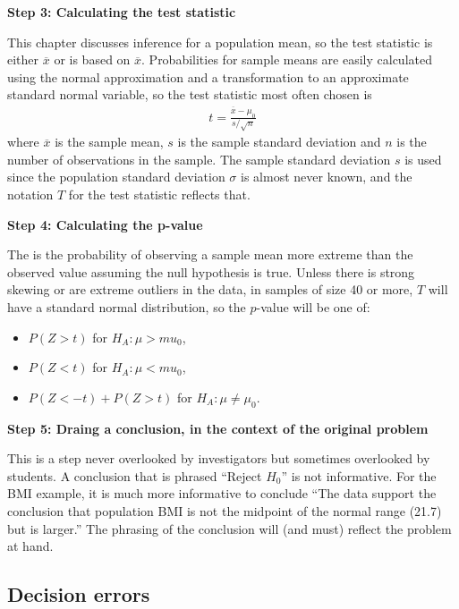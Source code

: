 \begin{spacing}{1.5}
\textbf{Step 3: Calculating the test statistic}

This chapter discusses inference for a population mean, so the test statistic is either $\overline{x}$ or is based on $\overline{x}$.  Probabilities for sample means are easily calculated using the normal approximation and a transformation to an approximate standard normal variable, so the test statistic most often chosen is 
\begin{eqnarray}
	t=\frac{\overline{x}-\mu_0}{s/\sqrt{n}}
	\end{eqnarray} 
where $\overline{x}$ is the sample mean, $s$ is the sample standard deviation and $n$ is the number of observations in the sample. The sample standard deviation $s$ is used since the population standard deviation $\sigma$ is almost never known, and the notation $T$ for the test statistic reflects that.

\textbf{Step 4: Calculating the p-value}

The  is the probability of observing a sample mean more extreme than the observed value assuming the null hypothesis is true. Unless there is strong skewing or are extreme outliers in the data, in samples of size 40 or more, $T$ will have a standard normal distribution, so the $p$-value will be one of:

\begin{itemize}
	\item $P(Z > t)$ for $H_A: \mu > mu_0$,
	
	\item $P(Z < t)$ for $H_A: \mu < mu_0$,
	
	\item $P(Z < -t) + P(Z > t) $ for $H_A: \mu \ne \mu_0.$
\end{itemize} 

\textbf{Step 5: Draing a conclusion, in the context of the original problem}

This is a step never overlooked by investigators but sometimes overlooked by students.  A conclusion that is phrased ``Reject $H_0$'' is not informative.  For the BMI example, it is much more informative to conclude ``The data support the conclusion that population BMI is not the midpoint of the normal range (21.7) but is larger.''  The phrasing of the conclusion will (and must) reflect the problem at hand.

\subsection{Decision errors}


\end{spacing}
